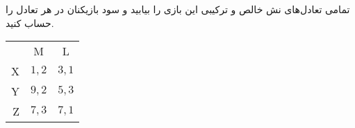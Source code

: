 تمامی تعادل‌های نش خالص و ترکیبی این بازی را بیابید و سود بازیکنان در هر تعادل را حساب کنید.
\LTR 
\begin{latin}
    \begin{center}
        \begin{tabular}{r | c | c |}
            \multicolumn{1}{r}{} &
            \multicolumn{1}{c}{M} &
            \multicolumn{1}{c}{L} \\ \cline{2-3}
            X       & $1,2$   & $3,1$    \\ \cline{2-3}
            Y       & $9,2$   & $5,3$    \\ \cline{2-3}
            Z       & $7,3$   & $7,1$    \\ \cline{2-3}
        \end{tabular}
    \end{center}
\end{latin}
\RTL